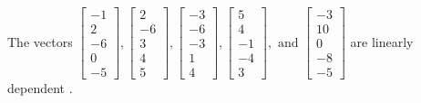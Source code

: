 \begin{exercise}
\begin{exerciseStatement}
  \end{exerciseStatement}
  \begin{exerciseAnswer}
   The vectors \(\left[\begin{array}{r}
-1 \\
2 \\
-6 \\
0 \\
-5
\end{array}\right] , \left[\begin{array}{r}
2 \\
-6 \\
3 \\
4 \\
5
\end{array}\right] , \left[\begin{array}{r}
-3 \\
-6 \\
-3 \\
1 \\
4
\end{array}\right] , \left[\begin{array}{r}
5 \\
4 \\
-1 \\
-4 \\
3
\end{array}\right] , \text{ and } \left[\begin{array}{r}
-3 \\
10 \\
0 \\
-8 \\
-5
\end{array}\right]\) are 
  	 linearly dependent  .
  


  \end{exerciseAnswer}
\end{exercise}